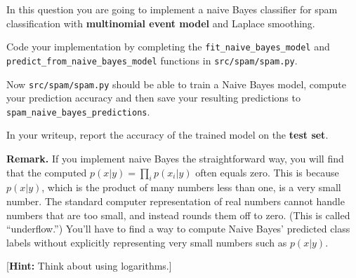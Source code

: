 \item {}
In this question you are going to implement a naive Bayes classifier for spam
classification with {\bf multinomial event model} and Laplace smoothing.

Code your implementation by completing the \texttt{fit\_naive\_bayes\_model}
and \\\texttt{predict\_from\_naive\_bayes\_model} functions in
\texttt{src/spam/spam.py}.

Now \texttt{src/spam/spam.py} should be able to train a Naive Bayes model,
compute your prediction accuracy and then save your resulting predictions
to \texttt{spam\_naive\_bayes\_predictions}.

In your writeup, report the accuracy of the trained model on the \textbf{test set}.

{\bf Remark.} If you implement naive Bayes the straightforward way, you will find
that the computed $p(x|y) = \prod_i p(x_i | y)$ often equals zero.  This is
because $p(x|y)$, which is the product of many numbers less than one, is a very
small  number. The standard computer representation of real numbers cannot
handle numbers that are too small, and instead rounds them off to zero.  (This
is called  ``underflow.'')  You'll have to find a way to compute Naive Bayes'
predicted  class labels without explicitly representing very small numbers such
as $p(x|y)$.

[\textbf{Hint:} Think about using logarithms.]

